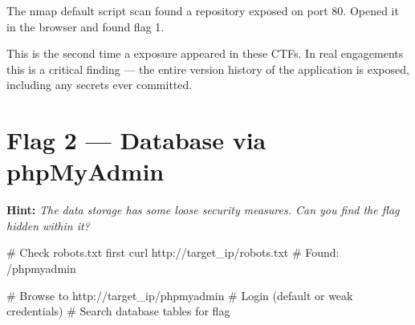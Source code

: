 \begin{notebox}

The nmap  default script scan found a  repository exposed
on port 80. Opened it in the browser and found flag 1.

\begin{takebox}
This is the second time a  exposure appeared in these CTFs. In real
engagements this is a critical finding --- the entire version history of the
application is exposed, including any secrets ever committed.
\end{takebox}

\section*{Flag 2 --- Database via phpMyAdmin}

\textbf{Hint:} \textit{The data storage has some loose security measures. Can
you find the flag hidden within it?}

\end{notebox}

\begin{termbox}
# Check robots.txt first
curl http://target_ip/robots.txt
# Found: /phpmyadmin

# Browse to http://target_ip/phpmyadmin
# Login (default or weak credentials)
# Search database tables for flag
\end{termbox}

